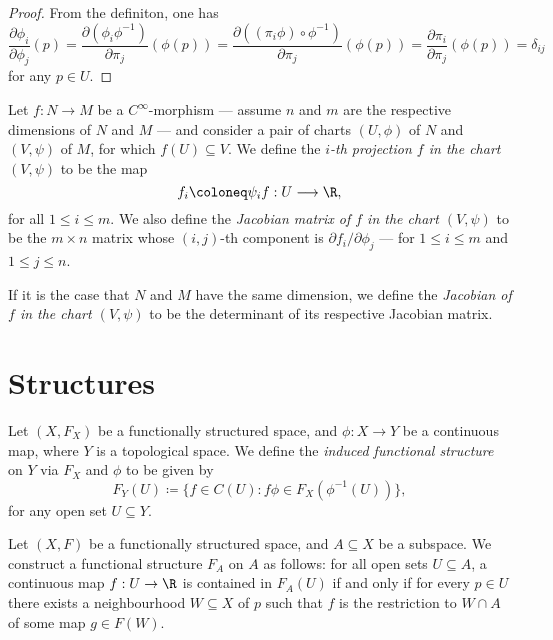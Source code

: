\begin{proof}
From the definiton, one has
\[
\frac{\partial \phi_{i}}{\partial \phi_j} (p)
= \frac{\partial (\phi_{i} \phi^{-1})}{\partial \pi_j} (\phi(p))
= \frac{\partial ((\pi_i \phi) \circ \phi^{-1})}{\partial \pi_j} (\phi(p))
= \frac{\partial \pi_i}{\partial \pi_j} (\phi(p))
= \delta_{i j}
\]
for any \(p \in U\).
\end{proof}

\begin{definition}[Jacobian]
\label{def:}
Let \(f: N \to M\) be a \(C^{\infty}\)-morphism --- assume \(n\) and \(m\) are
the respective dimensions of \(N\) and \(M\) --- and consider a pair of charts
\((U, \phi)\) of \(N\) and \((V, \psi)\) of \(M\), for which
\(f(U) \subseteq V\). We define the \emph{\(i\)-th projection \(f\) in the chart
  \((V, \psi)\)} to be the map
\[
f_i \coloneq \psi_i f: U \longrightarrow \R,
\]
for all \(1 \leq i \leq m\).  We also define the \emph{Jacobian matrix of \(f\)
  in the chart \((V, \psi)\)} to be the \(m \times n\) matrix whose
\((i, j)\)-th component is \(\partial f_i/\partial \phi_j\) --- for
\(1 \leq i \leq m\) and \(1 \leq j \leq n\).

If it is the case that \(N\) and \(M\) have the same dimension, we define the
\emph{Jacobian of \(f\) in the chart \((V, \psi)\)} to be the determinant of its
respective Jacobian matrix.
\end{definition}

\section{Structures}

\begin{definition}
\label{def:induced-functional-structure-space}
Let \((X, F_X)\) be a functionally structured space, and \(\phi: X \to Y\) be a
continuous map, where \(Y\) is a topological space. We define the \emph{induced
  functional structure} on \(Y\) via \(F_X\) and \(\phi\) to be given by
\[
F_Y(U) \coloneq \{f \in C(U) \colon f \phi \in F_X(\phi^{-1}(U))\},
\]
for any open set \(U \subseteq Y\).
\end{definition}

\begin{definition}
\label{def:induced-func-struc-on-subspace}
Let \((X, F)\) be a functionally structured space, and \(A \subseteq X\) be a
subspace. We construct a functional structure \(F_A\) on \(A\) as follows: for
all open sets \(U \subseteq A\), a continuous map \(f: U \to \R\) is contained
in \(F_A(U)\) if and only if for every \(p \in U\) there exists a neighbourhood
\(W \subseteq X\) of \(p\) such that \(f\) is the restriction to \(W \cap A\) of
some map \(g \in F(W)\).
\end{definition}

